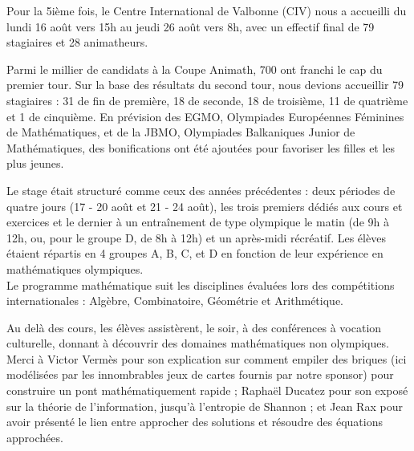 
Pour la 5ième fois, le Centre International de Valbonne (CIV) nous a accueilli du lundi 16 août vers 15h au jeudi 26 août vers 8h, avec un effectif final de 79 stagiaires et 28 animatheurs.

Parmi le millier de candidats à la Coupe Animath, 700 ont franchi le cap du premier tour. Sur la base des résultats du second tour, nous devions accueillir 79 stagiaires : 31 de fin de première, 18 de seconde, 18 de troisième, 11 de quatrième et 1 de cinquième. En prévision des EGMO, Olympiades Européennes Féminines de Mathématiques, et de la JBMO, Olympiades Balkaniques Junior de Mathématiques, des bonifications ont été ajoutées pour favoriser les filles et les plus jeunes.

Le stage était structuré comme ceux des années précédentes : deux périodes de quatre jours (17 - 20 août et 21 - 24 août), les trois premiers dédiés aux cours et exercices et le dernier à un entraînement de type olympique le matin (de 9h à 12h, ou, pour le groupe D, de 8h à 12h) et un après-midi récréatif. Les élèves étaient répartis en 4 groupes A, B, C, et D en fonction de leur expérience en mathématiques olympiques. \\
Le programme mathématique suit les disciplines évaluées lors des compétitions internationales : Algèbre, Combinatoire, Géométrie et Arithmétique.

Au delà des cours, les élèves assistèrent, le soir, à des conférences à vocation culturelle, donnant à découvrir des domaines mathématiques non olympiques. Merci à Victor Vermès pour son explication sur comment empiler des briques (ici modélisées par les innombrables jeux de cartes fournis par notre sponsor) pour construire un pont mathématiquement rapide ; Raphaël Ducatez pour son exposé sur la théorie de l'information, jusqu'à l'entropie de Shannon ; et Jean Rax pour avoir présenté le lien entre approcher des solutions et résoudre des équations approchées.

\vfill
\pagebreak
